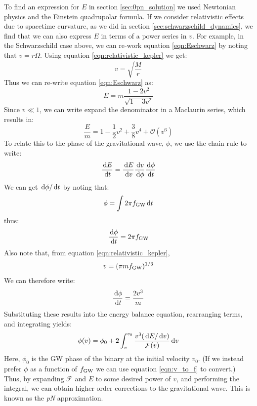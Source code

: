 To find an expression for $E$ in section \ref{sec:0pn_solution} we used Newtonian physics and the Einstein quadrupolar formula. If we consider relativistic effects due to spacetime curvature, as we did in section \ref{sec:schwarzschild_dynamics}, we find that we can also express $E$ in terms of a power series in $v$. For example, in the Schwarzschild case above, we can re-work equation \ref{eqn:Eschwarz} by noting that $v = r\Omega$. Using equation \ref{eqn:relativistic_kepler} we get:
\begin{equation}
v = \sqrt{\frac{M}{r}}
\end{equation}
Thus we can re-write equation \ref{eqn:Eschwarz} as:
\begin{equation}
E = m \frac{1-2v^2}{\sqrt{1-3v^2}}
\end{equation}
Since $v \ll 1$, we can write expand the denominator in a Maclaurin series, which results in:
\begin{equation}
\frac{E}{m} = 1 - \frac{1}{2}v^2 + \frac{3}{8}v^4 + \mathcal{O}(v^6)
\end{equation}
To relate this to the phase of the gravitational wave, $\phi$, we use the chain rule to write:
\begin{equation}
\frac{\,\mathrm{d} E}{\,\mathrm{d} t} = \frac{\,\mathrm{d} E}{\,\mathrm{d} v}\frac{\,\mathrm{d} v}{\,\mathrm{d} \phi}\frac{\,\mathrm{d} \phi}{\,\mathrm{d} t}
\end{equation}
We can get $\,\mathrm{d} \phi / \,\mathrm{d} t$ by noting that:
\begin{equation}
\phi = \int 2\pi f_{\mathrm{GW}} \,\mathrm{d} t
\end{equation}
thus:
\begin{equation}
\frac{\,\mathrm{d} \phi}{\,\mathrm{d} t} = 2\pi f_{\mathrm{GW}}
\end{equation}
Also note that, from equation \ref{eqn:relativistic_kepler},
\begin{equation}
\label{eqn:v_to_f}
v = (\pi m \fGW)^{1/3}
\end{equation}
We can therefore write:
\begin{equation}
\frac{\,\mathrm{d} \phi}{\,\mathrm{d} t} = \frac{2 v^3}{m}
\end{equation}
Substituting these results into the energy balance equation, rearranging terms, and integrating yields:
\begin{equation}
\phi(v) = \phi_0 + 2\int_{v}^{v_0} \frac{v^3 (\,\mathrm{d} E/\,\mathrm{d} v)}{\mathcal{F}(v)} \,\mathrm{d} v
\end{equation}
Here, $\phi_0$ is the \ac{GW} phase of the binary at the initial velocity $v_0$. (If we instead prefer $\phi$ as a function of $f_{\mathrm{GW}}$ we can use equation \ref{eqn:v_to_f} to convert.) Thus, by expanding $\mathcal{F}$ and $E$ to some desired power of $v$, and performing the integral, we can obtain higher order corrections to the gravitational wave. This is known as the \emph{\ac{pN}} approximation.

